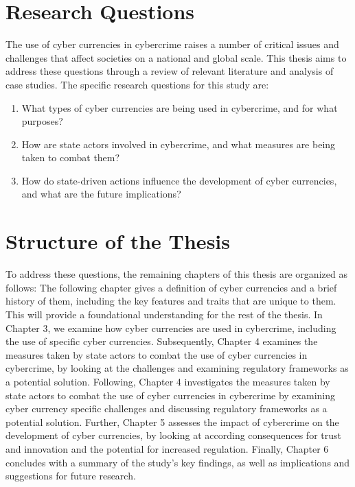 \section{Research Questions}
The use of cyber currencies in cybercrime raises a number of critical issues and challenges that affect societies on a national and global scale. This thesis aims to address these questions through a review of relevant literature and analysis of case studies. The specific research questions for this study are: 
\begin{enumerate}
    \item What types of cyber currencies are being used in cybercrime, and for what purposes?
    \item How are state actors involved in cybercrime, and what measures are being taken to combat them?
    \item How do state-driven actions influence the development of cyber currencies, and what are the future implications?
\end{enumerate}

\section{Structure of the Thesis}
To address these questions, the remaining chapters of this thesis are organized as follows:
The following chapter gives a definition of cyber currencies and a brief history of them, including the key features and traits that are unique to them. This will provide a foundational understanding for the rest of the thesis.
In Chapter 3, we examine how cyber currencies are used in cybercrime, including the use of specific cyber currencies.
Subsequently, Chapter 4 examines the measures taken by state actors to combat the use of cyber currencies in cybercrime, by looking at the challenges and examining regulatory frameworks as a potential solution.
Following, Chapter 4 investigates the measures taken by state actors to combat the use of cyber currencies in cybercrime by examining cyber currency specific challenges and discussing regulatory frameworks as a potential solution.
Further, Chapter 5 assesses the impact of cybercrime on the development of cyber currencies, by looking at according consequences for trust and innovation and the potential for increased regulation. 
Finally, Chapter 6 concludes with a summary of the study's key findings, as well as implications and suggestions for future research.


